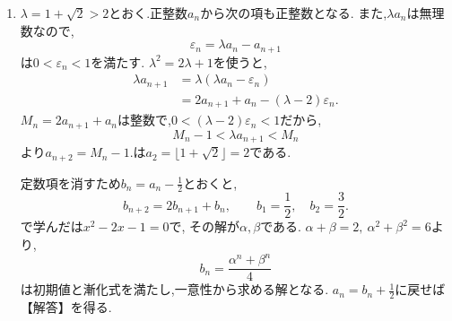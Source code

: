 \noindent {}\par\nobreak
\begin{enumerate}[label=(\arabic*),parsep=3pt,beginpenalty=10000,format=\bookitemlink{example-gauss-role-5}{solution}{problem}]
  \item $\lambda=1+\sqrt2>2$とおく.正整数$a_n$から次の項も正整数となる.
    また,$\lambda a_n$は無理数なので,
    \[
      \varepsilon_n=\lambda a_n-a_{n+1}
    \]
    は$0<\varepsilon_n<1$を満たす.
    $\lambda^2=2\lambda+1$を使うと,
    \begin{align*}
      \lambda a_{n+1}
      &=\lambda(\lambda a_n-\varepsilon_n)\\
      &=2a_{n+1}+a_n-(\lambda-2)\varepsilon_n.
    \end{align*}
    $M_n=2a_{n+1}+a_n$は整数で,$0<(\lambda-2)\varepsilon_n<1$だから,
    \[
      M_n-1<\lambda a_{n+1}<M_n
    \]
    より$a_{n+2}=M_n-1$.は$a_2=\lfloor1+\sqrt2\rfloor=2$である.

    定数項を消すため$b_n=a_n-\frac12$とおくと,
    \[
      b_{n+2}=2b_{n+1}+b_n,
      \qquad b_1=\frac12,\quad b_2=\frac32.
    \]
    で学んだは$x^2-2x-1=0$で,
    その解が$\alpha,\beta$である.
    $\alpha+\beta=2,\ \alpha^2+\beta^2=6$より,
    \[
      b_n=\frac{\alpha^n+\beta^n}{4}
    \]
    は初期値と漸化式を満たし,一意性から求める解となる.
    $a_n=b_n+\frac12$に戻せば【解答】を得る.
\end{enumerate}
